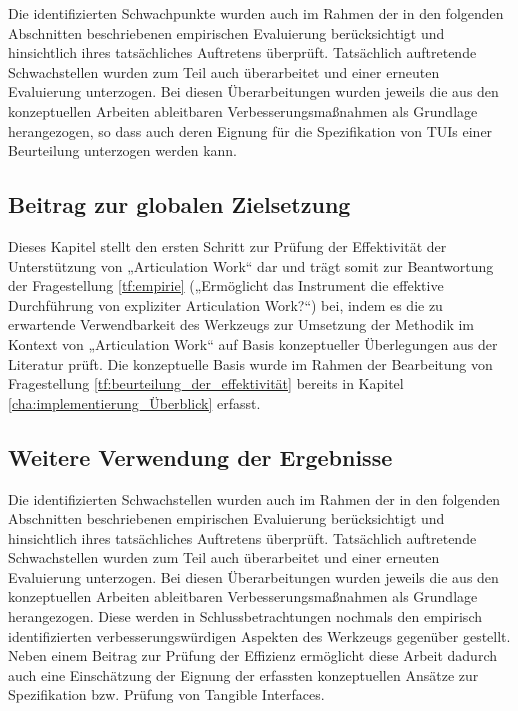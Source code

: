 Die identifizierten Schwachpunkte wurden auch im Rahmen der in den folgenden Abschnitten beschriebenen empirischen Evaluierung berücksichtigt und hinsichtlich ihres tatsächliches Auftretens überprüft. Tatsächlich auftretende Schwachstellen wurden zum Teil auch überarbeitet und einer erneuten Evaluierung unterzogen. Bei diesen Überarbeitungen wurden jeweils die aus den konzeptuellen Arbeiten ableitbaren Verbesserungsmaßnahmen als Grundlage herangezogen, so dass auch deren Eignung für die Spezifikation von \glspl{TUI} einer Beurteilung unterzogen werden kann.


\subsection{Beitrag zur globalen Zielsetzung}

Dieses Kapitel stellt den ersten Schritt zur Prüfung der Effektivität der Unterstützung von „Articulation Work“ dar und trägt somit zur Beantwortung der Fragestellung \ref{tf:empirie} („Ermöglicht das Instrument die effektive Durchführung von expliziter Articulation Work?“) bei, indem es die zu erwartende Verwendbarkeit des Werkzeugs zur Umsetzung der Methodik im Kontext von „Articulation Work“ auf Basis konzeptueller Überlegungen aus der Literatur prüft. Die konzeptuelle Basis wurde im Rahmen der Bearbeitung von Fragestellung \ref{tf:beurteilung_der_effektivität} bereits in Kapitel \ref{cha:implementierung_Überblick} erfasst.

\subsection{Weitere Verwendung der Ergebnisse}

Die identifizierten Schwachstellen wurden auch im Rahmen der in den folgenden Abschnitten beschriebenen empirischen Evaluierung berücksichtigt und hinsichtlich ihres tatsächliches Auftretens überprüft. Tatsächlich auftretende Schwachstellen wurden zum Teil auch überarbeitet und einer erneuten Evaluierung unterzogen. Bei diesen Überarbeitungen wurden jeweils die aus den konzeptuellen Arbeiten ableitbaren Verbesserungsmaßnahmen als Grundlage herangezogen. Diese werden in Schlussbetrachtungen nochmals den empirisch identifizierten verbesserungswürdigen Aspekten des Werkzeugs gegenüber gestellt. Neben einem Beitrag zur Prüfung der Effizienz ermöglicht diese Arbeit dadurch auch eine Einschätzung der Eignung der erfassten konzeptuellen Ansätze zur Spezifikation bzw. Prüfung von Tangible Interfaces.


